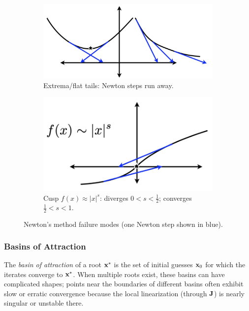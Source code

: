 \begin{figure}[H]
    \centering
    \begin{subfigure}{0.48\linewidth}
    \centering
    \includegraphics[width=0.98\linewidth]{figs/nle/failuremode1.png}
    \caption{Extrema/flat tails: Newton steps run away.}
    \end{subfigure}\hfill
    \begin{subfigure}{0.48\linewidth}
    \centering
    \includegraphics[width=0.98\linewidth]{figs/nle/failuremode2.png}
    \caption{Cusp $f(x)\approx|x|^{s}$: diverges $0<s<\frac12$; converges $\frac12<s<1$.}
    \end{subfigure}
    
    \caption{Newton's method failure modes (one Newton step shown in blue).}
    \label{fig:failure-modes}
\end{figure}
    
\subsubsection{Basins of Attraction}
\label{par:basins-of-attraction}
The \emph{basin of attraction} of a root \(\mathbf{x}^*\) is the set of initial guesses \(\mathbf{x}_0\) for which the iterates converge to \(\mathbf{x}^*\). When multiple roots exist, these basins can have complicated shapes; points near the boundaries of different basins often exhibit slow or erratic convergence because the local linearization (through \(\mathbf{J}\)) is nearly singular or unstable there.

